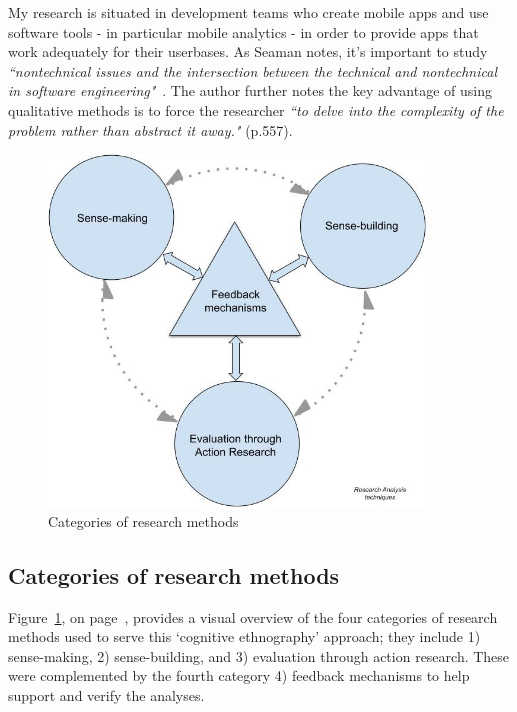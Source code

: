 My research is situated in development teams who create mobile apps and use software tools - in particular mobile analytics - in order to provide apps that work adequately for their userbases. As Seaman notes, it's important to study \emph{``nontechnical issues and the intersection between the technical and nontechnical in software engineering"}~\citep[p.557]{seaman1999_qualitative_methods_in_esse}. The author further notes the key advantage of using qualitative methods is to force the researcher \emph{``to delve into the complexity of the problem rather than abstract it away."} (p.557).



\begin{figure}
    \centering
    \includegraphics[width=10cm]{images/my/analysis-techniques-in-PhD-08-Nov-2021.jpeg}
    \caption{Categories of research methods}
    \label{fig:categories-of-research-methods}
\end{figure}

\subsection{Categories of research methods}
Figure~\ref{fig:categories-of-research-methods}, on page~\pageref{fig:categories-of-research-methods}, provides a visual overview of the four categories of research methods used to serve this `cognitive ethnography' approach; they include 1) sense-making, 2) sense-building, and 3) evaluation through action research. These were complemented by the fourth category 4) feedback mechanisms to help support and verify the analyses. 


